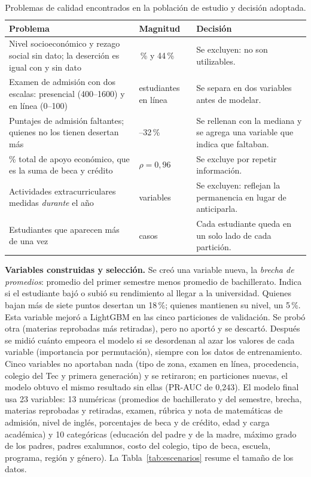 \documentclass[11pt,a4paper]{article}
\begin{document}
\begin{table}[!t]
\centering
\footnotesize
\caption{Problemas de calidad encontrados en la población de estudio y decisión adoptada.}
\label{tab:calidad}
\begin{tabular}{>{\raggedright\arraybackslash}p{5.6cm}>{\raggedright\arraybackslash}p{2.4cm}>{\raggedright\arraybackslash}p{6.2cm}}
\toprule
Problema & Magnitud & Decisión \\
\midrule
Nivel socioeconómico y rezago social sin dato; la deserción es igual con y sin dato & 55\,\% y 44\,\% & Se excluyen: no son utilizables. \\
Examen de admisión con dos escalas: presencial (400--1600) y en línea (0--100) & 570 estudiantes en línea & Se separa en dos variables antes de modelar. \\
Puntajes de admisión faltantes; quienes no los tienen desertan más & 22--32\,\% & Se rellenan con la mediana y se agrega una variable que indica que faltaban. \\
\% total de apoyo económico, que es la suma de beca y crédito & $\rho=0{,}96$ & Se excluye por repetir información. \\
Actividades extracurriculares medidas \emph{durante} el año & 9 variables & Se excluyen: reflejan la permanencia en lugar de anticiparla. \\
Estudiantes que aparecen más de una vez & 6 casos & Cada estudiante queda en un solo lado de cada partición. \\
\bottomrule
\end{tabular}
\end{table}

\textbf{Variables construidas y selección.} Se creó una variable nueva, la \emph{brecha de promedios}: promedio del primer semestre menos promedio de bachillerato. Indica si el estudiante bajó o subió su rendimiento al llegar a la universidad. Quienes bajan más de siete puntos desertan un 18\,\%; quienes mantienen su nivel, un 5\,\%. Esta variable mejoró a LightGBM en las cinco particiones de validación. Se probó otra (materias reprobadas más retiradas), pero no aportó y se descartó. Después se midió cuánto empeora el modelo si se desordenan al azar los valores de cada variable (importancia por permutación), siempre con los datos de entrenamiento. Cinco variables no aportaban nada (tipo de zona, examen en línea, procedencia, colegio del Tec y primera generación) y se retiraron; en particiones nuevas, el modelo obtuvo el mismo resultado sin ellas (PR-AUC de 0,243). El modelo final usa 23 variables: 13 numéricas (promedios de bachillerato y del semestre, brecha, materias reprobadas y retiradas, examen, rúbrica y nota de matemáticas de admisión, nivel de inglés, porcentajes de beca y de crédito, edad y carga académica) y 10 categóricas (educación del padre y de la madre, máximo grado de los padres, padres exalumnos, costo del colegio, tipo de beca, escuela, programa, región y género). La Tabla~\ref{tab:escenarios} resume el tamaño de los datos.
\end{document}
